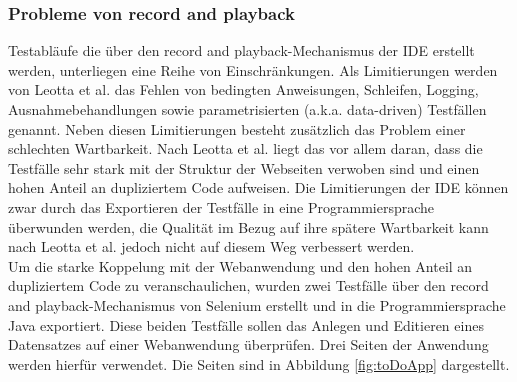 \subsubsection{Probleme von record and playback}
\label{sec:probleme_von_recorde_and_playback}
Testabläufe die über den \grq record and playback\grq -Mechanismus der IDE erstellt werden, unterliegen eine Reihe von Einschränkungen. Als Limitierungen werden von Leotta et al. \cite{leotta_repairing_2013} das Fehlen von bedingten Anweisungen, Schleifen, Logging, Ausnahmebehandlungen sowie parametrisierten (a.k.a. data-driven) Testfällen genannt.
Neben diesen Limitierungen besteht zusätzlich das Problem einer schlechten Wartbarkeit. Nach Leotta et al. \cite{leotta_repairing_2013} liegt das vor allem daran, dass die Testfälle sehr stark mit der Struktur der Webseiten verwoben sind und einen hohen Anteil an dupliziertem Code aufweisen.
Die Limitierungen der IDE können zwar durch das Exportieren der Testfälle in eine Programmiersprache überwunden werden, die Qualität im Bezug auf ihre spätere Wartbarkeit kann nach  Leotta et al. \cite{leotta_repairing_2013} jedoch nicht auf diesem Weg verbessert werden.\\
Um die starke Koppelung mit der Webanwendung und den hohen Anteil an dupliziertem Code zu veranschaulichen, wurden zwei Testfälle über den \grq record and playback\grq -Mechanismus von Selenium erstellt und in die Programmiersprache Java exportiert.
Diese beiden Testfälle sollen das Anlegen und Editieren eines Datensatzes auf einer Webanwendung überprüfen.
Drei Seiten der Anwendung werden hierfür verwendet. Die Seiten sind in Abbildung \ref{fig:toDoApp} dargestellt.

